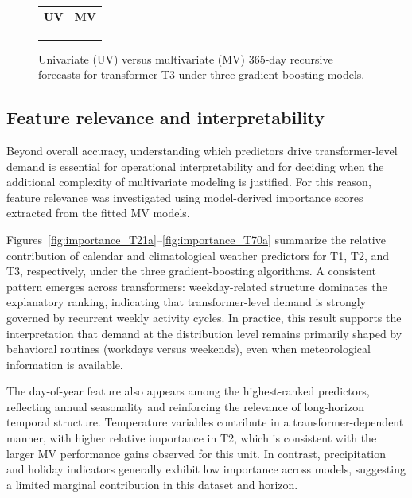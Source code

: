 \begin{figure}[!h]
\centering
\setlength{\tabcolsep}{3pt}
\renewcommand{\arraystretch}{1.0}
\begin{tabular}{cc}
\textbf{UV} & \textbf{MV} \\
 &
 \\
 &
 \\
 &
 \\
\end{tabular}
\caption{Univariate (UV) versus multivariate (MV) 365-day recursive forecasts for transformer T3 under three gradient boosting models.}
\label{fig:matrix_T3}
\end{figure}

\subsection{Feature relevance and interpretability}
\label{subsec:feature_importance}

Beyond overall accuracy, understanding which predictors drive transformer-level demand is essential for operational interpretability and for deciding when the additional complexity of multivariate modeling is justified. For this reason, feature relevance was investigated using model-derived importance scores extracted from the fitted MV models.

Figures~\ref{fig:importance_T21a}--\ref{fig:importance_T70a} summarize the relative contribution of calendar and climatological weather predictors for T1, T2, and T3, respectively, under the three gradient-boosting algorithms. A consistent pattern emerges across transformers: weekday-related structure dominates the explanatory ranking, indicating that transformer-level demand is strongly governed by recurrent weekly activity cycles. In practice, this result supports the interpretation that demand at the distribution level remains primarily shaped by behavioral routines (workdays versus weekends), even when meteorological information is available.

The day-of-year feature also appears among the highest-ranked predictors, reflecting annual seasonality and reinforcing the relevance of long-horizon temporal structure. Temperature variables contribute in a transformer-dependent manner, with higher relative importance in T2, which is consistent with the larger MV performance gains observed for this unit. In contrast, precipitation and holiday indicators generally exhibit low importance across models, suggesting a limited marginal contribution in this dataset and horizon.

